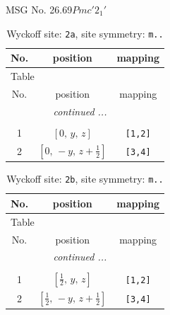 \documentclass[fleqn,8pt]{jsarticle}
\begin{document}
\setcounter{MaxMatrixCols}{32}

\renewcommand{\tablename}{Table~}
\renewcommand{\figurename}{Figure~}
\begin{center}
\LARGE
MSG No. 26.69\quad$Pmc'2_{1}'$
\end{center}
\renewcommand{\arraystretch}{1.2}
\begin{longtable}{ccc}
\caption{Wyckoff site: {\tt 2a}, site symmetry: {\tt m..}}
 \\
 \hline \hline
No. & position & mapping \\ \hline \endfirsthead

\multicolumn{2}{l}{\tablename\ \thetable{}} \\
 \hline \hline
No. & position & mapping \\ \hline \endhead

 \hline \hline
\multicolumn{2}{r}{\footnotesize\it continued ...} \\ \endfoot

 \hline \hline
\multicolumn{2}{r}{} \\ \endlastfoot

1 & $\left[ 0,\, y,\, z \right]$ & {\tt [1,2]} \\ \hline
2 & $\left[ 0,\, - y,\, z + \frac{1}{2} \right]$ & {\tt [3,4]} \\
\end{longtable}
\renewcommand{\arraystretch}{1.2}
\begin{longtable}{ccc}
\caption{Wyckoff site: {\tt 2b}, site symmetry: {\tt m..}}
 \\
 \hline \hline
No. & position & mapping \\ \hline \endfirsthead

\multicolumn{2}{l}{\tablename\ \thetable{}} \\
 \hline \hline
No. & position & mapping \\ \hline \endhead

 \hline \hline
\multicolumn{2}{r}{\footnotesize\it continued ...} \\ \endfoot

 \hline \hline
\multicolumn{2}{r}{} \\ \endlastfoot

1 & $\left[ \frac{1}{2},\, y,\, z \right]$ & {\tt [1,2]} \\ \hline
2 & $\left[ \frac{1}{2},\, - y,\, z + \frac{1}{2} \right]$ & {\tt [3,4]} \\
\end{longtable}
\renewcommand{\arraystretch}{1.2}
\end{document}
